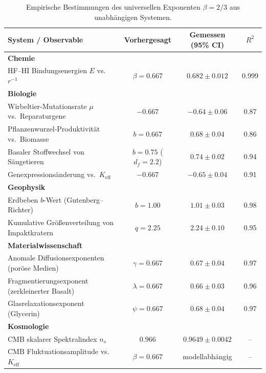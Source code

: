 \documentclass[11pt,a4paper]{article}
\begin{document}
	\begin{table}[H]
		\centering
		\caption{Empirische Bestimmungen des universellen Exponenten \(\beta = 2/3\) aus unabhängigen Systemen.}
		\label{tab:empirical-beta}
		\small
		\begin{tabular}{lccc}
			\toprule
			\textbf{System / Observable} & \textbf{Vorhergesagt} & \textbf{Gemessen (95\% CI)} & \(R^2\) \\
			\midrule
			\textbf{Chemie} & & & \\
			\quad HF–HI Bindungsenergien \(E\) vs.\ \(r^{-1}\) & \(\beta = 0.667\) & \(0.682 \pm 0.012\) & 0.999 \\
			\textbf{Biologie} & & & \\
			\quad Wirbeltier‑Mutationsrate \(\mu\) vs.\ Reparaturgene & \(-0.667\) & \(-0.64 \pm 0.06\) & 0.87 \\
			\quad Pflanzenwurzel‑Produktivität vs.\ Biomasse & \(b = 0.667\) & \(0.68 \pm 0.04\) & 0.86 \\
			\quad Basaler Stoffwechsel von Säugetieren & \(b = 0.75\) (\(d_f=2.2\)) & \(0.74 \pm 0.02\) & 0.94 \\
			\quad Genexpressionsänderung vs.\ \(K_{\mathrm{eff}}\) & \(-0.667\) & \(-0.65 \pm 0.04\) & 0.91 \\
			\textbf{Geophysik} & & & \\
			\quad Erdbeben \(b\)-Wert (Gutenberg–Richter) & \(b = 1.00\) & \(1.01 \pm 0.03\) & 0.98 \\
			\quad Kumulative Größenverteilung von Impaktkratern & \(q = 2.25\) & \(2.24 \pm 0.10\) & 0.95 \\
			\textbf{Materialwissenschaft} & & & \\
			\quad Anomale Diffusionsexponenten (poröse Medien) & \(\gamma = 0.667\) & \(0.67 \pm 0.04\) & 0.97 \\
			\quad Fragmentierungsexponent (zerkleinerter Basalt) & \(\lambda = 0.667\) & \(0.66 \pm 0.03\) & 0.96 \\
			\quad Glasrelaxationsexponent (Glycerin) & \(\psi = 0.667\) & \(0.68 \pm 0.04\) & 0.97 \\
			\textbf{Kosmologie} & & & \\
			\quad CMB skalarer Spektralindex \(n_s\) & \(0.966\) & \(0.9649 \pm 0.0042\) & -- \\
			\quad CMB Fluktuationsamplitude vs.\ \(K_{\mathrm{eff}}\) & \(\beta = 0.667\) & modellabhängig & -- \\
			\bottomrule
		\end{tabular}
	\end{table}
	
\end{document}
